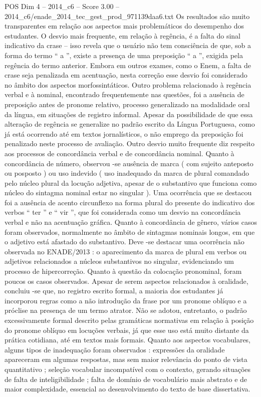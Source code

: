 \begin{textsample}{POS Dim 4 – 2014\_c6 – Score 3.00 – 2014\_c6/enade\_2014\_tec\_gest\_prod\_971139daa6.txt}
Os resultados são muito transparentes em relação aos aspectos mais problemáticos do desempenho dos estudantes.
O desvio mais frequente, em relação à regência, é a falta do sinal indicativo da crase – isso revela que o usuário não tem consciência de que, sob a forma do termo “ a ”, existe a presença de uma preposição “ a ”, exigida pela regência do termo anterior.
Embora em outros exames, como o Enem, a falta de crase seja penalizada em acentuação, nesta correção esse desvio foi considerado no âmbito dos aspectos morfossintáticos.
Outro problema relacionado à regência verbal e à nominal, encontrado frequentemente nas questões, foi a ausência de preposição antes de pronome relativo, processo generalizado na modalidade oral da língua, em situações de registro informal.
Apesar da possibilidade de que essa alteração de regência se generalize no padrão escrito da Língua Portuguesa, como já está ocorrendo até em textos jornalísticos, o não emprego da preposição foi penalizado neste processo de avaliação.
Outro desvio muito frequente diz respeito aos processos de concordância verbal e de concordância nominal.
Quanto à concordância de número, observou -se ausência de marca ( com sujeito anteposto ou posposto ) ou uso indevido ( uso inadequado da marca de plural comandado pelo núcleo plural da locução adjetiva, apesar de o substantivo que funciona como núcleo do sintagma nominal estar no singular ).
Uma ocorrência que se destacou foi a ausência de acento circunflexo na forma plural do presente do indicativo dos verbos “ ter ” e “ vir ”, que foi considerada como um desvio na concordância verbal e não na acentuação gráfica.
Quanto à concordância de gênero, vários casos foram observados, normalmente no âmbito de sintagmas nominais longos, em que o adjetivo está afastado do substantivo.
Deve -se destacar uma ocorrência não observada no ENADE/2013 : o aparecimento da marca de plural em verbos ou adjetivos relacionados a núcleos substantivos no singular, evidenciando um processo de hipercorreção.
Quanto à questão da colocação pronominal, foram poucos os casos observados.
Apesar de serem aspectos relacionados à oralidade, concluiu -se que, no registro escrito formal, a maioria dos estudantes já incorporou regras como a não introdução da frase por um pronome oblíquo e a próclise na presença de um termo atrator.
Não se adotou, entretanto, o padrão excessivamente formal descrito pelas gramáticas normativas em relação à posição do pronome oblíquo em locuções verbais, já que esse uso está muito distante da prática cotidiana, até em textos mais formais.
Quanto aos aspectos vocabulares, alguns tipos de inadequação foram observados : expressões da oralidade apareceram em algumas respostas, mas sem maior relevância do ponto de vista quantitativo ; seleção vocabular incompatível com o contexto, gerando situações de falta de inteligibilidade ; falta de domínio de vocabulário mais abstrato e de maior complexidade, essencial ao desenvolvimento do texto de base dissertativa.

\end{textsample}
